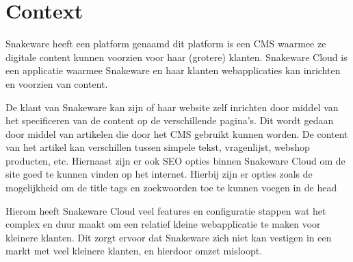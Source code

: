 \section{Context}
Snakeware heeft een platform genaamd  dit platform is een \gls{CMS} waarmee ze digitale content kunnen voorzien voor haar (grotere) klanten.
Snakeware Cloud is een applicatie waarmee Snakeware en haar klanten webapplicaties kan inrichten en voorzien van content.

\whitespace[2]
De klant van Snakeware kan zijn of haar website zelf inrichten door middel van het specificeren van de content op de verschillende pagina’s.
Dit wordt gedaan door middel van artikelen die door het \gls{CMS} gebruikt kunnen worden.
De content van het artikel kan verschillen tussen simpele tekst, vragenlijst, webshop producten, etc.
Hiernaast zijn er ook \gls{SEO} opties binnen Snakeware Cloud om de site goed te kunnen vinden op het internet.
Hierbij zijn er opties zoals de mogelijkheid om de title tags en zoekwoorden toe te kunnen voegen in de head \Parencite{HTMLhead}

\whitespace[2]
Hierom heeft Snakeware Cloud veel features en configuratie stappen wat het complex en duur maakt om een relatief kleine webapplicatie te maken voor kleinere klanten.
Dit zorgt ervoor dat Snakeware zich niet kan vestigen in een markt met veel kleinere klanten, en hierdoor omzet misloopt.
